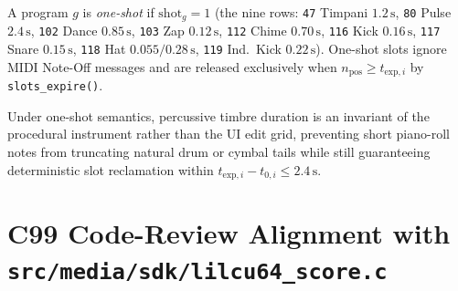 \begin{definition}
A program $g$ is \emph{one-shot} if $\mathrm{shot}_g = 1$ (the nine rows: \texttt{47} Timpani $1.2\,\text{s}$, \texttt{80} Pulse $2.4\,\text{s}$, \texttt{102} Dance $0.85\,\text{s}$, \texttt{103} Zap $0.12\,\text{s}$, \texttt{112} Chime $0.70\,\text{s}$, \texttt{116} Kick $0.16\,\text{s}$, \texttt{117} Snare $0.15\,\text{s}$, \texttt{118} Hat $0.055/0.28\,\text{s}$, \texttt{119} Ind.\ Kick $0.22\,\text{s}$). One-shot slots ignore MIDI Note-Off messages and are released exclusively when $n_{\mathrm{pos}} \ge t_{\mathrm{exp},i}$ by \texttt{slots\_expire()}.
\end{definition}

\begin{proposition}
Under one-shot semantics, percussive timbre duration is an invariant of the procedural instrument rather than the UI edit grid, preventing short piano-roll notes from truncating natural drum or cymbal tails while still guaranteeing deterministic slot reclamation within $t_{\mathrm{exp},i} - t_{0,i} \le 2.4\,\text{s}$.
\end{proposition}

\section{C99 Code-Review Alignment with \texttt{src/media/sdk/lilcu64\_score.c}}

